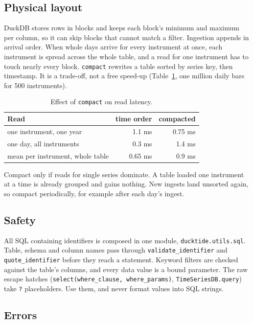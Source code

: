 \documentclass[11pt,a4paper]{article}
\newcommand{\code}[1]{\texttt{#1}}
\begin{document}
\subsection{Physical layout}

DuckDB stores rows in blocks and keeps each block's minimum and maximum per column, so it
can skip blocks that cannot match a filter. Ingestion appends in arrival order. When whole
days arrive for every instrument at once, each instrument is spread across the whole
table, and a read for one instrument has to touch nearly every block. \code{compact}
rewrites a table sorted by series key, then timestamp. It is a trade-off, not a free
speed-up (Table~\ref{tab:compact}, one million daily bars for 500 instruments).

\begin{table}[h]
\centering\small
\begin{tabular}{@{}lrr@{}}
\toprule
Read & time order & compacted \\
\midrule
one instrument, one year        & 1.1 ms  & 0.75 ms \\
one day, all instruments        & 0.3 ms  & 1.4 ms \\
mean per instrument, whole table & 0.65 ms & 0.9 ms \\
\bottomrule
\end{tabular}
\caption{Effect of \code{compact} on read latency.}
\label{tab:compact}
\end{table}

Compact only if reads for single series dominate. A table loaded one instrument at a
time is already grouped and gains nothing. New ingests land unsorted again, so compact
periodically, for example after each day's ingest.

\subsection{Safety}

All SQL containing identifiers is composed in one module, \code{ducktide.utils.sql}.
Table, schema and column names pass through \code{validate\_identifier} and
\code{quote\_identifier} before they reach a statement. Keyword filters are checked against
the table's columns, and every data value is a bound parameter. The raw escape hatches
(\code{select(where\_clause, where\_params)}, \code{TimeSeriesDB.query}) take \code{?}
placeholders. Use them, and never format values into SQL strings.

\subsection{Errors}
\end{document}
